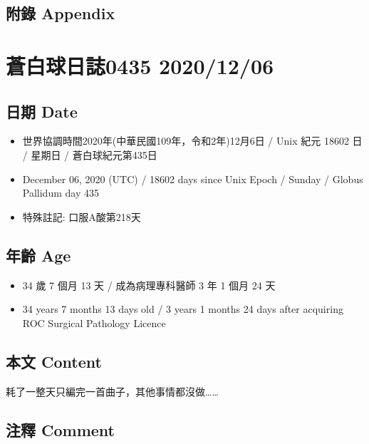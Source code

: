 \documentclass[
]{article}
\providecommand{\tightlist}{%
  \setlength{\itemsep}{0pt}\setlength{\parskip}{0pt}}
\begin{document}
\hypertarget{ux9644ux9304-appendix-4}{%
\subsection{附錄 Appendix}\label{ux9644ux9304-appendix-4}}

\hypertarget{ux84bcux767dux7403ux65e5ux8a8c0435-20201206}{%
\section{蒼白球日誌0435
2020/12/06}\label{ux84bcux767dux7403ux65e5ux8a8c0435-20201206}}

\hypertarget{ux65e5ux671f-date-5}{%
\subsection{日期 Date}\label{ux65e5ux671f-date-5}}

\begin{itemize}
\tightlist
\item
  世界協調時間2020年(中華民國109年，令和2年)12月6日 / Unix 紀元 18602 日
  / 星期日 / 蒼白球紀元第435日
\item
  December 06, 2020 (UTC) / 18602 days since Unix Epoch / Sunday /
  Globus Pallidum day 435
\item
  特殊註記: 口服A酸第218天
\end{itemize}

\hypertarget{ux5e74ux9f61-age-5}{%
\subsection{年齡 Age}\label{ux5e74ux9f61-age-5}}

\begin{itemize}
\tightlist
\item
  34 歲 7 個月 13 天 / 成為病理專科醫師 3 年 1 個月 24 天
\item
  34 years 7 months 13 days old / 3 years 1 months 24 days after
  acquiring ROC Surgical Pathology Licence
\end{itemize}

\hypertarget{ux672cux6587-content-5}{%
\subsection{本文 Content}\label{ux672cux6587-content-5}}

耗了一整天只編完一首曲子，其他事情都沒做\ldots\ldots{}

\hypertarget{ux6ce8ux91cb-comment-5}{%
\subsection{注釋 Comment}\label{ux6ce8ux91cb-comment-5}}
\end{document}
